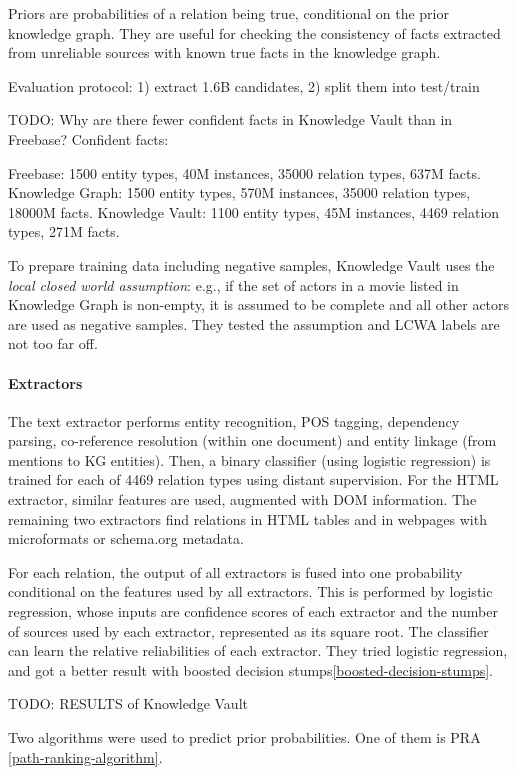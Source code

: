 Priors are probabilities of a relation being true, conditional
on the prior knowledge graph. They are useful for checking the consistency of
facts extracted from unreliable sources with known true facts in the knowledge
graph.

Evaluation protocol: 1) extract 1.6B candidates, 2) split them into test/train

TODO: Why are there fewer confident facts in Knowledge Vault than in Freebase?
Confident facts:

Freebase: 1500 entity types, 40M instances, 35000 relation types, 637M
facts.
Knowledge Graph: 1500 entity types, 570M instances, 35000 relation types, 18000M
facts.
Knowledge Vault: 1100 entity types, 45M instances, 4469 relation types, 271M
facts.

To prepare training data including negative samples, Knowledge Vault uses the
\textit{local closed world assumption}: e.g., if the set of actors in a movie listed
in Knowledge Graph is non-empty, it is assumed to be complete and all other
actors are used as negative samples.
They tested the assumption and LCWA labels are not too far off.

\paragraph{Extractors}
The text extractor performs entity recognition, POS tagging, dependency parsing,
co-reference resolution (within one document) and entity linkage (from mentions
to KG entities).
Then, a binary classifier (using logistic regression) is trained for each of
4469 relation types using distant supervision.
For the HTML extractor, similar features are used, augmented with DOM
information.
The remaining two extractors find relations in HTML tables and in webpages
with microformats or schema.org metadata.

For each relation, the output of all extractors is fused into one probability
conditional on the features used by all extractors. This is performed by
logistic regression, whose inputs are confidence scores of each extractor and
the number of sources used by each extractor, represented as its square root.
The classifier can learn the relative reliabilities of each extractor.
They tried logistic regression, and got a better result with boosted decision
stumps\ref{boosted-decision-stumps}.

TODO: RESULTS of Knowledge Vault

Two algorithms were used to predict prior probabilities.
One of them is PRA \ref{path-ranking-algorithm}.

